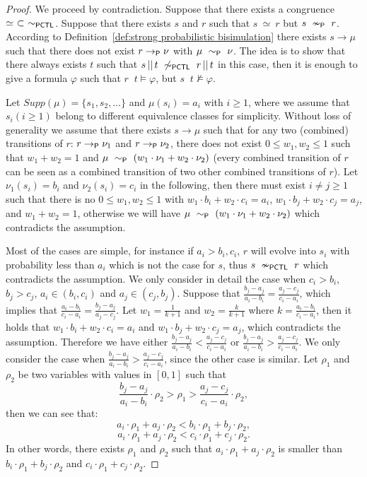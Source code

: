 \documentclass{LMCS}
\def\phi{\varphi}
\DeclareMathOperator{\interleave}{||}
\newcommand{\TRAN}[2]{#1\rightarrow #2}
\newcommand{\TRANP}[2]{#1\rightarrow_{{\sf P}}#2}
\newcommand{\BSP}{\ensuremath{\sim_{{\sf P}}}}
\newcommand{\nBSP}{\ensuremath{\nsim_{{\sf P}}}}
\newcommand{\PCTL}{{\sf PCTL}}
\newcommand{\EPCTL}{\sim_{\PCTL}}
\newcommand{\nEPCTL}{\nsim_{\PCTL}}
\newcommand{\PAR}[2]{#1\interleave#2}
\newcommand{\SUPP}{\mathit{Supp}}
\begin{document}
\begin{proof}
  We proceed by contradiction. Suppose that there exists a congruence
  $\simeq~\subset~\EPCTL$. Suppose that there exists
  $s$ and $r$ such that $s~\simeq~r$ but $s~\nBSP~r$. According to
  Definition~\ref{def:strong probabilistic bisimulation} there exists
  $s\TRAN{}\mu$ such that there does not exist $r\TRANP{}\nu$ with
  $\mu~\BSP~\nu$. The idea is to show that there always exists $t$
  such that $\PAR{s}{t}~\not\EPCTL~\PAR{r}{t}$ in this case, then it
  is enough to give a formula $\phi$ such that
  $\PAR{r}{t}\models\phi$, but $\PAR{s}{t}\not\models\phi$.

Let $\SUPP(\mu)=\{s_1,s_2,\ldots\}$ and $\mu(s_i)=a_i$ with $i\geq 1$,
where we assume that $s_i(i\geq 1)$ belong to different
  equivalence classes for simplicity. Without loss of generality we
assume that there exists $s\TRAN{}\mu$ such that for any two
(combined) transitions of $r$: $r\TRANP{}\nu_1$ and $r\TRANP{}\nu_2$,
there does not exist $0\leq w_1,w_2\leq 1$ such that $w_1 + w_2 = 1$
and $\mu~\BSP~(w_1\cdot\nu_1 + w_2\cdot\nu_2)$ (every combined
transition of $r$ can be seen as a combined transition of two other
combined transitions of $r$). Let $\nu_1(s_i)=b_i$ and
$\nu_2(s_i)=c_i$ in the following, then there must exist $i\neq j\geq
1$ such that there is no $0\leq w_1,w_2\leq 1$ with $w_1\cdot b_i
+ w_2\cdot c_i=a_i$, $w_1\cdot b_j + w_2\cdot c_j=a_j$, and
$w_1+w_2=1$, otherwise we will have $\mu~\BSP~(w_1\cdot\nu_1 +
w_2\cdot\nu_2)$ which contradicts the assumption.

Most of the cases are simple, for instance if $a_i>b_i,c_i$, $r$
will evolve into $s_i$ with probability less than $a_i$ which is not
the case for $s$, thus $s~\nEPCTL~r$ which contradicts the assumption.
We only consider in detail the case when $c_i> b_i$, $b_j> c_j$, $a_i\in(b_i,c_i)$ and $a_j\in(c_j,b_j)$.
Suppose that $\frac{b_j-a_j}{a_i-b_i}=\frac{a_j-c_j}{c_i-a_i}$,
which implies that $\frac{a_i-b_i}{c_i-a_i}=\frac{b_j-a_j}{a_j-c_j}$. Let
$w_1=\frac{1}{k+1}$ and $w_2=\frac{k}{k+1}$ where $k=\frac{a_i-b_i}{c_i-a_i}$,
then it holds that $w_1\cdot b_i + w_2\cdot c_i=a_i$ and $w_1\cdot b_j + w_2\cdot c_j=a_j$, which contradicts the assumption. Therefore we have either $\frac{b_j-a_j}{a_i-b_i}<\frac{a_j-c_j}{c_i-a_i}$
or $\frac{b_j-a_j}{a_i-b_i}>\frac{a_j-c_j}{c_i-a_i}$. We only consider the case
when $\frac{b_j-a_j}{a_i-b_i}>\frac{a_j-c_j}{c_i-a_i}$, since the other case
is similar. Let $\rho_1$ and $\rho_2$ be
two variables with values in $[0,1]$ such that
$$\frac{b_j-a_j}{a_i-b_i}\cdot\rho_2 > \rho_1 > \frac{a_j-c_j}{c_i-a_i}\cdot\rho_2,$$
then we can see that:
$$
a_i\cdot\rho_1 + a_j\cdot\rho_2 < b_i\cdot\rho_1 + b_j\cdot\rho_2,$$
$$a_i\cdot\rho_1 + a_j\cdot\rho_2 < c_i\cdot\rho_1 + c_j\cdot\rho_2.
$$
In other words, there exists $\rho_1$ and $\rho_2$ such that
$a_i\cdot\rho_1 + a_j\cdot\rho_2$ is smaller than $b_i\cdot\rho_1 + b_j\cdot\rho_2$ and $c_i\cdot\rho_1 + c_j\cdot\rho_2$.


\end{proof}
\end{document}
